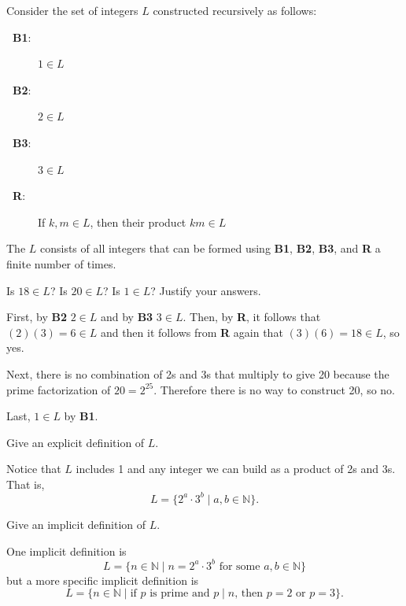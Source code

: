 \begin{exam}
\label{exam_mult_2and3_set}
    Consider the set of integers $L$ constructed recursively as follows:
        \begin{description}
            \item [\textbf{~\quad B1}:] $1 \in L$
            \item [\textbf{~\quad B2}:] $2 \in L$
            \item [\textbf{~\quad B3}:] $3 \in L$
            \item [\textbf{~\quad R}:] If $k,m \in L$, then their product $km \in L$
        \end{description}
    The $L$ consists of all integers that can be formed using \textbf{B1}, \textbf{B2}, \textbf{B3}, and \textbf{R} a finite number of times.  
        \begin{apart}
            \item Is $18 \in L$?  Is $20 \in L$?  Is $1 \in L$? Justify your answers.
                \begin{soln}
                    First, by \textbf{B2} $2 \in L$ and by \textbf{B3} $3 \in L$.  Then, by \textbf{R}, it follows that $(2)(3) = 6 \in L$ and then it follows from \textbf{R} again that $(3)(6)=18 \in L$, so yes.  

                    Next, there is no combination of 2s and 3s that multiply to give 20 because the prime factorization of $20=2^25$.  Therefore there is no way to construct 20, so no. 

                    Last, $1 \in L$ by \textbf{B1}.
                \end{soln}
            \item Give an explicit definition of $L$.
                \begin{soln}
                    Notice that $L$ includes 1 and any integer we can build as a product of 2s and 3s. That is,
                        $$L= \{2^a\cdot 3^b \mid a,b \in \mathbb{N}\}.$$
                \end{soln}
            \item Give an implicit definition of $L$.
                \begin{soln}
                One implicit definition is 
                    $$L = \{ n \in \mathbb{N} \mid n = 2^a\cdot 3^b \text{ for some } a,b \in \mathbb{N}\}$$
                but a more specific implicit definition is
                    $$L = \{ n \in \mathbb{N} \mid \text{if } p \text{ is prime and } p \mid n \text{, then } p=2 \text{ or } p=3\}.$$
                \end{soln}
        \end{apart}
\end{exam}

